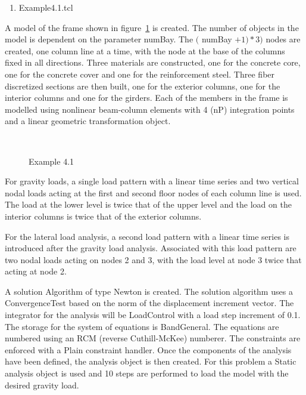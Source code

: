 \documentclass[12pt]{article}
\begin{document}
\vspace{0.2in}  
\begin{enumerate} 
\item Example4.1.tcl
\end{enumerate}

\vspace{0.2in} 

A model of the frame shown in figure~\ref{example4} is created. The
number of objects in the model is dependent on the parameter
numBay. The $($ numBay $+1)*3)$ nodes are 
created, one column line at a time, with the node at the base of the
columns fixed in all directions. Three materials are
constructed, one for the concrete core, one for the concrete cover and
one for the reinforcement steel. Three fiber discretized sections are
then built, one for the exterior columns, one for the interior columns
and one for the girders. Each of the members in the frame is modelled
using nonlinear beam-column elements with 4 (nP) integration points
and a linear geometric transformation object.

\begin{figure}[h]
\begin{center}
\leavevmode
\hbox{%
\epsfxsize=5.5in
}
\end{center}
\caption{Example 4.1}
\label{example4}
\end{figure}


For gravity loads, a single load pattern with a linear time series and two
vertical nodal loads acting at the first and second floor nodes of
each column line is used. The load at the lower level is twice that of the
upper level and the load on the interior columns is twice that of the
exterior columns.

For the lateral load analysis, a second load pattern
with a linear time series is introduced after the gravity load
analysis. Associated with this load pattern are two nodal loads acting
on nodes 2 and 3, with the load level at node 3 twice that acting at
node 2. 



\vspace{0.2in}

A solution Algorithm of type Newton is created. The solution
algorithm uses a ConvergenceTest based on the norm
of the displacement increment vector. The integrator for the analysis
will be LoadControl with a load step increment of 0.1. The storage for
the system of equations is BandGeneral. The equations are numbered
using an RCM (reverse Cuthill-McKee) numberer. The constraints are
enforced with a Plain constraint handler. Once the components of the
analysis have been defined, the analysis object is then created. For
this problem a Static analysis object is used and 10 steps
are performed to load the model with the desired gravity load.
\end{document}
